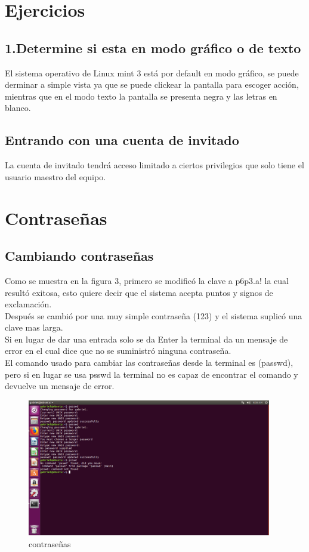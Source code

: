 \documentclass[
  letterpaper, 
  maincolor=black,
  sectioncolor=black!90,
  subsectioncolor=black!70,
  itemtextcolor=black!40,
]{fortysecondscv}
\begin{document}
\section{Ejercicios}
\subsection{1.Determine si esta en modo gráfico o de texto}
    El sistema operativo de Linux mint 3 está por default en modo gráfico, se puede derminar a simple vista ya que se puede clickear la pantalla para escoger acción, mientras que en el modo texto la pantalla se presenta negra y las letras en blanco. 
\subsection{Entrando con una cuenta de invitado}
    La cuenta de invitado tendrá acceso limitado a ciertos privilegios que solo tiene el usuario maestro del equipo.
\section{Contraseñas}
\subsection{Cambiando contraseñas}
    Como se muestra en la figura 3, primero se modificó la clave a p6p3.a! la cual resultó exitosa, esto quiere decir que el sistema acepta puntos y signos de exclamación.\\
    Después se cambió por una muy simple contraseña (123) y el sistema suplicó una clave mas larga.\\
    Si en lugar de dar una entrada solo se da Enter la terminal da un mensaje de error en el cual dice que no se suministró ninguna contraseña.\\
    El comando usado para cambiar las contraseñas desde la terminal es (passwd), pero si en lugar se usa psswd la terminal no es capaz de encontrar el comando y devuelve un mensaje de error.
    \begin{figure}[H]
        \centering
        \includegraphics[trim= 0 295 666 0,clip,width=0.95\textwidth]{img/contrasena.jpg}
        \caption{contraseñas}
        \label{fig:my_label}
    \end{figure}
\end{document}
